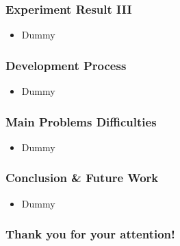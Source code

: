 \documentclass{beamer}
\begin{document}
\begin{frame}
\frametitle{Experiment Result III}
\begin{itemize}
 \item Dummy
\end{itemize}
\end{frame}



\begin{frame}
\frametitle{Development Process}
\begin{itemize}
 \item Dummy
\end{itemize}
\end{frame}


\begin{frame}
\frametitle{Main Problems Difficulties}
\begin{itemize}
 \item Dummy
\end{itemize}
\end{frame}


\begin{frame}
\frametitle{Conclusion \& Future Work}
\begin{itemize}
 \item Dummy
\end{itemize}
\end{frame}




\begin{frame}
\begin{center}
\frametitle{Thank you for your attention!}
\end{center}
\end{frame}
\end{document}

